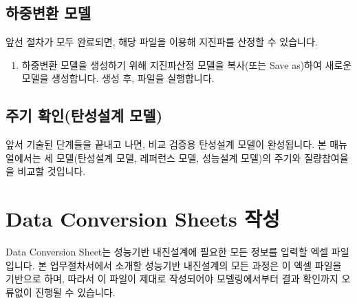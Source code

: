 \documentclass[a4paper,11pt,korean,openany,oneside]{sphinxmanual}
\begin{document}
\section{하중변환 모델}
\label{\detokenize{1_loads_conversion_model:id1}}\label{\detokenize{1_loads_conversion_model::doc}}
\sphinxAtStartPar
앞선 절차가 모두 완료되면, 해당 파일을 이용해 지진파를 산정할 수 있습니다.

\begin{sphinxShadowBox}
\begin{enumerate}
%
\item {} 
\sphinxAtStartPar
하중변환 모델을 생성하기 위해 지진파산정 모델을 복사(또는 Save as)하여 새로운 모델을 생성합니다.
생성 후, 파일을 실행합니다.

\end{enumerate}
\end{sphinxShadowBox}

\sphinxstepscope


\section{주기 확인(탄성설계 모델)}
\label{\detokenize{1_period_check_model:id1}}\label{\detokenize{1_period_check_model::doc}}
\sphinxAtStartPar
앞서 기술된 단계들을 끝내고 나면, 비교 검증용 탄성설계 모델이 완성됩니다.
본 매뉴얼에서는 세 모델(탄성설계 모델, 레퍼런스 모델, 성능설계 모델)의 주기와 질량참여율을 비교할 것입니다.

\sphinxstepscope


\chapter{Data Conversion Sheets 작성}
\label{\detokenize{2_data_conv_sheets:data-conversion-sheets}}\label{\detokenize{2_data_conv_sheets::doc}}
\sphinxAtStartPar
Data Conversion Sheet는 성능기반 내진설계에 필요한 모든 정보를 입력할 엑셀 파일입니다.
본 업무절차서에서 소개할 성능기반 내진설계의 모든 과정은 이 엑셀 파일을 기반으로 하며,
따라서 이 파일이 제대로 작성되어야 모델링에서부터 결과 확인까지 오류없이 진행될 수 있습니다.
\end{document}
